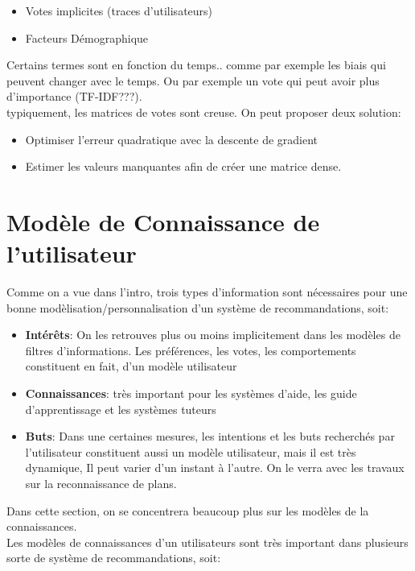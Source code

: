 \documentclass[oneside]{book}
\begin{document}
\begin{itemize}
\item Votes implicites (traces d'utilisateurs)
\item Facteurs Démographique
\end{itemize}
Certains termes sont en fonction du temps.. comme par exemple les biais qui peuvent changer avec le temps. Ou par exemple un vote qui peut avoir plus d'importance (TF-IDF???).\\

typiquement, les matrices de votes sont creuse. On peut proposer deux solution:\\
\begin{itemize}
\item Optimiser l'erreur quadratique avec la descente de gradient
\item Estimer les valeurs manquantes afin de créer une matrice dense.
\end{itemize}

\chapter{Modèle de Connaissance de l'utilisateur}
Comme on a vue dans l'intro, trois types d'information sont nécessaires pour une bonne modèlisation/personnalisation d'un système de recommandations, soit:\\

\begin{itemize}
\item \textbf{Intérêts}: On les retrouves plus ou moins implicitement dans les modèles de filtres d'informations. Les préférences, les votes, les comportements constituent en fait, d'un modèle utilisateur
\item \textbf{Connaissances}: très important pour les systèmes d'aide, les guide d'apprentissage et les systèmes tuteurs
\item \textbf{Buts}: Dans une certaines mesures, les intentions et les buts recherchés par l'utilisateur constituent aussi un modèle utilisateur, mais il est très dynamique, Il peut varier d'un instant à l'autre. On le verra avec les travaux sur la reconnaissance de plans. 
\end{itemize}

Dans cette section, on se concentrera beaucoup plus sur les modèles de la connaissances.\\

Les modèles de connaissances d'un utilisateurs sont très important dans plusieurs sorte de système de recommandations, soit:\\
\end{document}
